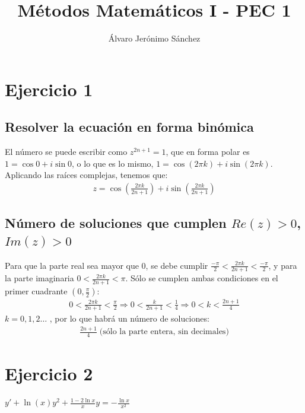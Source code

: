 \documentclass[]{scrartcl}
\title{\vspace{-1.8cm} Métodos Matemáticos I - PEC 1}
\author{Álvaro Jerónimo Sánchez}
\date{}
\begin{document}
\maketitle
\setcounter{section}{0}
\renewcommand{\tablename}{Tabla}


\section{Ejercicio 1}

\subsection{Resolver la ecuación en forma binómica}

El número se puede escribir como $z^{2n+1}=1$, que en forma polar es $1=\cos0+i \sin0$, o lo que es lo mismo, $1=\cos(2\pi k)+i \sin(2\pi k)$. Aplicando las raíces complejas, tenemos que:
\begin{gather*}
	\boxed{z=\cos\left( \frac{2\pi k}{2n+1} \right) + i\sin\left( \frac{2\pi k}{2n+1} \right)}
\end{gather*}

\subsection{Número de soluciones que cumplen $Re(z)>0$, $Im(z)>0$}

Para que la parte real sea mayor que 0, se debe cumplir $\frac{-\pi}{2}<\frac{2\pi k}{2n+1}<\frac{-\pi}{2}$, y para la parte imaginaria $0<\frac{2\pi k}{2n+1}<\pi$. Sólo se cumplen ambas condiciones en el primer cuadrante $(0,\frac{\pi}{2})$:
\begin{gather*}
	0 < \frac{2\pi k}{2n+1}  < \frac{\pi}{2} \Rightarrow 0 < \frac{k}{2n+1}  < \frac{1}{4} \Rightarrow 0 < k < \frac{2n+1}{4}
\end{gather*}
$k=0,1,2\ldots$ , por lo que habrá un número de soluciones:
\begin{gather*}
	\boxed{\frac{2n+1}{4}} \; \text{(sólo la parte entera, sin decimales)}
\end{gather*}


\section{Ejercicio 2}

\begin{center}
$y'+\ln (x)y^2+\frac{1-2\ln x}{x}y=-\frac{\ln x}{x^2}$
\end{center}
\end{document}
